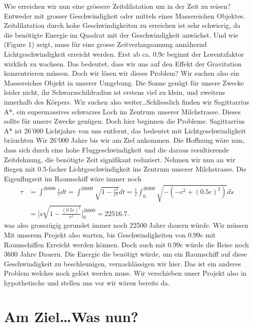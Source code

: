 \begin{refsection}
	Wie erreichen wir nun eine grössere Zeitdilatation um in der Zeit zu reisen? Entweder mit grosser Geschwindigkeit oder mittels eines Massereichen Objektes. Zeitdilatation durch hohe Geschwindigkeiten zu erreichen ist sehr schwierig, da die benötigte Energie im Quadrat mit der Geschwindigkeit anwächst. Und wie (Figure 1) zeigt, muss für eine grosse Zeitverlangsamung annähernd Lichtgeschwindigkeit erreicht werden. Erst ab ca. $0.9c$ beginnt der Lorentzfaktor wirklich zu wachsen.
	Das bedeutet, dass wir uns auf den Effekt der Gravitation  konzentrieren müssen.
	Doch wir lösen wir dieses Problem? Wir suchen also ein Massereiches Objekt in unserer Umgebung. Die Sonne genügt für unsere Zwecke leider nicht, ihr Schwarzschildradius ist erstens viel zu klein, und zweitens innerhalb des Körpers. Wir suchen also weiter\dots Schliesslich finden wir Sagittarrius A*, ein supermassives schwarzes Loch im Zentrum unserer Milchstrasse. Dieses sollte für unsere Zwecke genügen. 
	Doch hier beginnen die Probleme. 
	Sagittarrius A* ist 26'000 Lichtjahre von uns entfernt, das bedeutet mit Lichtgeschwindigkeit bräuchten Wir 26'000 Jahre bis wir am Ziel ankommen. Die Hoffnung wäre nun, dass sich durch eine hohe Fluggeschwindigkeit und die daraus resultierende Zeitdehnung, die benötigte Zeit signifikant reduziert. 
	Nehmen wir nun an wir fliegen mit 0.5-facher Lichtgeschwindigkeit ins Zentrum unserer Milchstrasse. Die Eigenflugzeit im Raumschiff wäre immer noch
	\begin{align*}
	\tau
	&= 
	\int_{}^{26000}\frac{1}{\gamma}dt=\int_{}^{26000}\sqrt{1-\frac{v^2}{c^2}}dt
	= 
	\frac{1}{c}\int_{0}^{26000}\sqrt{-(-c^2+(0.5c)^2)}ds\\
	&=
	\biggl[s\sqrt{1-\frac{(0.5c)^{2}}{c^2}}\biggr]_0^{26000}
	=
	22516.7.
	\end{align*}
	was also grosszügig gerundet immer noch 22500 Jahre dauern würde. 
	Wir müssen Mit unserem Projekt also warten, bis Geschwindigkeiten von 0.99c mit Raumschiffen Erreicht werden können. Doch auch mit 0.99c würde die Reise noch 3600 Jahre Dauern. Die Energie die benötigt würde, um ein Raumschiff auf diese Geschwindigkeit zu beschleunigen, vernachlässigen wir hier. Das ist ein anderes Problem welches noch gelöst werden muss.
	Wir verschieben unser Projekt also in hypothetische und stellen uns vor wir wären bereits da.
	
	\section{Am Ziel\dots Was nun?}
	

\end{refsection}
